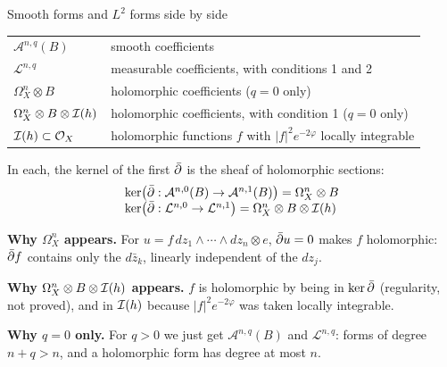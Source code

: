 \begin{frame}{Smooth forms and \(L^2\) forms side by side}
\label{fr:smooth-vs-l2}
\begin{center}
\renewcommand{\arraystretch}{1.0}
\begin{tabular}{ll}
\hline
\(\mathcal A^{n,q}(B)\) & smooth coefficients\\
\(\mathcal L^{n,q}\) & measurable coefficients, with conditions 1 and 2\\
\hline
\(\Omega^n_X\otimes B\) & holomorphic coefficients (\(q=0\) only)\\
\(\Omega^n_X\otimes B\otimes\mathcal I(h)\) & holomorphic coefficients, with condition 1 (\(q=0\) only)\\
\hline
\(\mathcal I(h)\subset\mathcal O_X\) & holomorphic functions \(f\) with \(|f|^2e^{-2\varphi}\) locally integrable\\
\hline
\end{tabular}
\end{center}
\vspace{-6pt}
In each, the kernel of the first \(\bar\partial\) is the sheaf of holomorphic sections:
\[
\begin{array}{l}
\ker\bigl(\bar\partial:\mathcal A^{n,0}(B)\to\mathcal A^{n,1}(B)\bigr)=\Omega^n_X\otimes B\\
\ker\bigl(\bar\partial:\mathcal L^{n,0}\to\mathcal L^{n,1}\bigr)=\Omega^n_X\otimes B\otimes\mathcal I(h)
\end{array}
\]
\par\vspace{-8pt}\noindent
\textbf{Why \(\Omega^n_X\) appears.} For \(u=f\,dz_1\wedge\cdots\wedge dz_n\otimes e\), \(\bar\partial u=0\) makes \(f\) holomorphic: \(\bar\partial f\) contains only the \(d\bar z_k\), linearly independent of the \(dz_j\).
\par\vspace{1pt}
\textbf{Why \(\Omega^n_X\otimes B\otimes\mathcal I(h)\) appears.} \(f\) is holomorphic by being in \(\ker\bar\partial\) (regularity, not proved), and in \(\mathcal I(h)\) because \(|f|^2e^{-2\varphi}\) was taken locally integrable.
\par\vspace{1pt}
\textbf{Why \(q=0\) only.} For \(q>0\) we just get \(\mathcal A^{n,q}(B)\) and \(\mathcal L^{n,q}\): forms of degree \(n+q>n\), and a holomorphic form has degree at most \(n\).
\end{frame}

